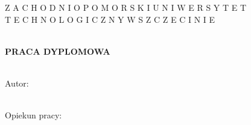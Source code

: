 \begin{titlepage}

 \centering
  \vfill                          
    { \large
        Z A C H O D N I O P O M O R S K I  \hspace{0.3 cm}  U N I W E R S Y T E T \\ 
        \vspace{0.2cm}
        T E C H N O L O G I C Z N Y \hspace{0.3 cm} W \hspace{0.3 cm} S Z C Z E C I N I E    } \\
    \vspace{1.cm}
   \\ 


    \vspace{2.0 cm}

      \huge \textbf{PRACA DYPLOMOWA}\\ 

  \vspace{3.cm}                   
     { \huge \Tytul}\\ 
  


\begin{flushleft}
  \vspace{2.7 cm}
  {\large
  
 
        \hspace{7.0 cm}    Autor: \\
        \hspace{7.0 cm}    \Autor \\
  }

 \vspace{1.2 cm}

  {\large
        \hspace{7.0 cm}     Opiekun pracy: \\
        \hspace{7.0 cm}     \Opiekun \\
  }
\end{flushleft}

   \vspace{1.5 cm}
   {\large \Rok}
   \vfill                         
\end{titlepage}
